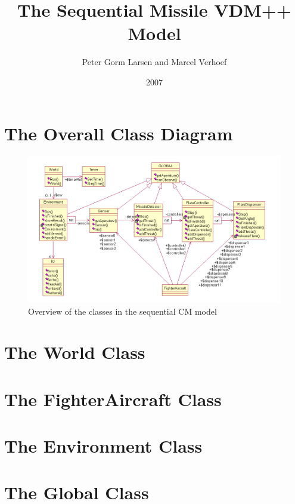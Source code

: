 \documentclass[\pformat,12pt]{article}
\title{The Sequential Missile VDM++ Model}
\author{Peter Gorm Larsen and Marcel Verhoef}
\date{2007}
\begin{document}
\maketitle

\section{The Overall Class Diagram}

\begin{figure}[h]
\begin{center}
\includegraphics[width=\textwidth]{seqCMclassdiag.png}
\end{center}
\caption{Overview of the classes in the sequential CM model}\label{fig:inputoutput}
\end{figure}
\newpage

\section{The World Class}



\section{The FighterAircraft Class}



\section{The Environment Class}



\section{The Global Class}
\end{document}
